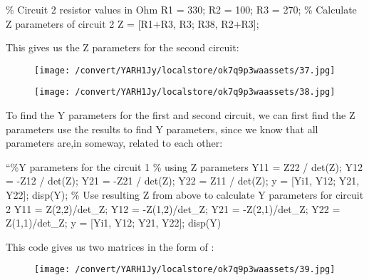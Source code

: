 \documentclass[12pt]{report}
\begin{document}
\vspace{10pt}

    \% Circuit 2 resistor values in Ohm   R1 = 330;   R2 = 100;   R3 = 270;   \% Calculate Z parameters of circuit 2  Z = [R1+R3, R3; R38, R2+R3]; 

\vspace{10pt}

    This gives us the Z parameters for the second circuit: 

\vspace{10pt}

\begin{figure}[h]

\texttt{[image: /convert/YARH1Jy/localstore/ok7q9p3waassets/37.jpg]}

\centering

\end{figure}

\begin{figure}[h]

\texttt{[image: /convert/YARH1Jy/localstore/ok7q9p3waassets/38.jpg]}

\centering

\end{figure}

\par

\vspace{10pt}

    To find the Y parameters for the first and second circuit, we can first find  the Z parameters use the results to find Y parameters, since we know that  all parameters are,in someway, related to each other: 

\vspace{10pt}

    “\%Y parameters for the circuit 1  \% using Z parameters   Y11 = Z22 / det(Z);   Y12 = -Z12 / det(Z);   Y21 = -Z21 / det(Z);   Y22 = Z11 / det(Z);   y = [Yi1, Y12; Y21, Y22];  disp(Y);   \% Use resulting Z from above to calculate Y parameters for circuit 2  Y11 = Z(2,2)/det\_Z;   Y12 = -Z(1,2)/det\_Z;   Y21 = -Z(2,1)/det\_Z;   Y22 = Z(1,1)/det\_Z;   y = [Yi1, Y12; Y21, Y22];  disp(Y) 

\vspace{10pt}

    This code gives us two matrices in the form of : 

\vspace{10pt}

\begin{figure}[h]

\texttt{[image: /convert/YARH1Jy/localstore/ok7q9p3waassets/39.jpg]}

\centering

\end{figure}
\end{document}
